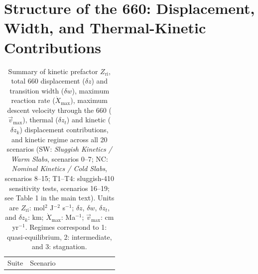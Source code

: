 \documentclass[final]{agujournal2019}
\begin{document}
\clearpage

\section*{Structure of the 660: Displacement, Width, and Thermal-Kinetic
Contributions}\label{sec:structure-of-the-660}

\begin{longtable}[]{@{}
  >{\raggedright\arraybackslash}p{}
  >{\raggedleft\arraybackslash}p{}
  >{\raggedleft\arraybackslash}p{}
  >{\raggedleft\arraybackslash}p{}
  >{\raggedleft\arraybackslash}p{}
  >{\raggedleft\arraybackslash}p{}
  >{\raggedleft\arraybackslash}p{}
  >{\raggedleft\arraybackslash}p{}
  >{\raggedleft\arraybackslash}p{}
  >{\raggedleft\arraybackslash}p{}@{}}
\caption{Summary of kinetic prefactor \(Z_\mathrm{ri}\), total 660
displacement (\(\delta z\)) and transition width (\(\delta w\)), maximum
reaction rate (\(\dot{X}_\mathrm{max}\)), maximum descent velocity
through the 660 (\(\vec{v}_\mathrm{max}\)), thermal (\(\delta z_t\)) and
kinetic (\(\delta z_k\)) displacement contributions, and kinetic regime
across all 20 scenarios (SW: \emph{Sluggish Kinetics / Warm Slabs},
scenarios 0--7; NC: \emph{Nominal Kinetics / Cold Slabs}, scenarios
8--15; T1--T4: sluggish-410 sensitivity tests, scenarios 16--19; see
Table 1 in the main text). Units are \(Z_\mathrm{ri}\): mol\(^2\)
J\(^{-2}\) s\(^{-1}\); \(\delta z\), \(\delta w\), \(\delta z_t\), and
\(\delta z_k\): km; \(\dot{X}_\mathrm{max}\): Ma\(^{-1}\);
\(\vec{v}_\mathrm{max}\): cm yr\(^{-1}\). Regimes correspond to 1:
quasi-equilibrium, 2: intermediate, and 3:
stagnation.}\label{tbl:depth-profile-summary}\tabularnewline
\toprule\noalign{}
\begin{minipage}[b]{\linewidth}\raggedright
Suite
\end{minipage} & \begin{minipage}[b]{\linewidth}\raggedleft
Scenario
\end{minipage} & \begin{minipage}[b]{\linewidth}\raggedleft

\end{minipage}
\end{longtable}
\end{document}
